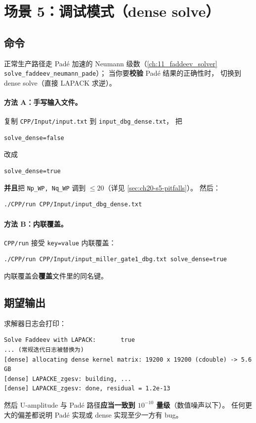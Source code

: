 \section{场景 5：调试模式（dense solve）}
\label{sec:ch20-scenario-dense}

\subsection{命令}
\label{sec:ch20-s5-cmd}

正常生产路径走 Padé 加速的 Neumann 级数（\cref{ch:11_faddeev_solver} \texttt{solve\_faddeev\_neumann\_pade}）；
当你要\textbf{校验} Padé 结果的正确性时，
切换到 dense solve（直接 LAPACK 求逆）。

\paragraph{方法 A：手写输入文件。}
复制 \texttt{CPP/Input/input.txt} 到 \texttt{input\_dbg\_dense.txt}，
把
\begin{lstlisting}[style=config]
solve_dense=false
\end{lstlisting}
改成
\begin{lstlisting}[style=config]
solve_dense=true
\end{lstlisting}
\textbf{并且}把 \texttt{Np\_WP, Nq\_WP} 调到 $\le 20$（详见 \cref{sec:ch20-s5-pitfalls}）。
然后：
\begin{lstlisting}[style=config]
./CPP/run CPP/Input/input_dbg_dense.txt
\end{lstlisting}

\paragraph{方法 B：内联覆盖。}
\texttt{CPP/run} 接受 \texttt{key=value} 内联覆盖：
\begin{lstlisting}[style=config]
./CPP/run CPP/Input/input_miller_gate1_dbg.txt solve_dense=true
\end{lstlisting}
内联覆盖会\textbf{覆盖}文件里的同名键。

\subsection{期望输出}
\label{sec:ch20-s5-expect}

求解器日志会打印：
\begin{lstlisting}[style=config]
Solve Faddeev with LAPACK:       true
... (常规迭代日志被替换为)
[dense] allocating dense kernel matrix: 19200 x 19200 (cdouble) -> 5.6 GB
[dense] LAPACKE_zgesv: building, ...
[dense] LAPACKE_zgesv: done, residual = 1.2e-13
\end{lstlisting}
然后 U-amplitude 与 Padé 路径\textbf{应当一致到 $10^{-10}$ 量级}（数值噪声以下）。
任何更大的偏差都说明 Padé 实现或 dense 实现至少一方有 bug。

